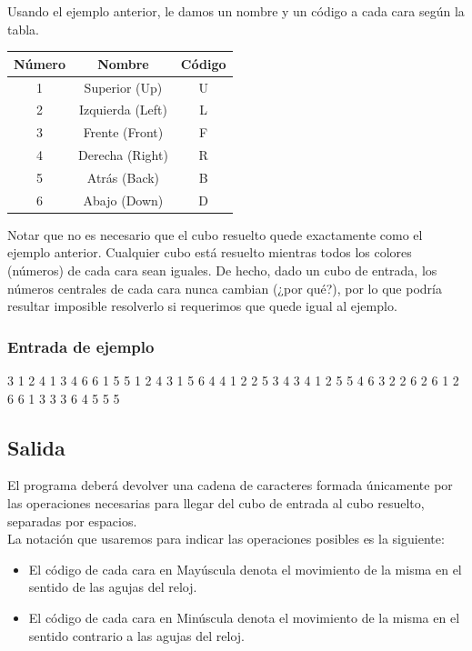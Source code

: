 \documentclass[11pt,a4paper]{article}
\begin{document}
Usando el ejemplo anterior, le damos un nombre y un código a cada cara según la tabla. \\

\begin{center}
\begin{tabular}{| c || c | c |}
\hline
Número & Nombre & Código \\ \hline
1 & Superior (Up) & U \\ \hline
2 & Izquierda (Left) & L \\ \hline
3 & Frente (Front) & F \\ \hline
4 & Derecha (Right) & R \\ \hline
5 & Atrás (Back) & B \\ \hline
6 & Abajo (Down) & D \\ \hline
\end{tabular}
\end{center}

Notar que no es necesario que el cubo resuelto quede exactamente como el ejemplo anterior. Cualquier cubo está resuelto mientras todos los colores (números) de cada cara sean iguales.
De hecho, dado un cubo de entrada, los números centrales de cada cara nunca cambian (¿por qué?), por lo que podría resultar imposible resolverlo si requerimos que quede igual al ejemplo.

\subsubsection{Entrada de ejemplo}
\begin{center}
\begin{verbbox}
      3 1 2
      4 1 3
      4 6 6
1 5 5 1 2 4 3 1 5 6 4 4
1 2 2 5 3 4 3 4 1 2 5 5
4 6 3 2 2 6 2 6 1 2 6 6
      1 3 3
      3 6 4
      5 5 5
\end{verbbox}
\theverbbox
\end{center}


\subsection{Salida}
El programa deberá devolver una cadena de caracteres formada únicamente por las operaciones necesarias para llegar del cubo de entrada al cubo resuelto, separadas por espacios.\\
La notación que usaremos para indicar las operaciones posibles es la siguiente:
\begin{itemize}
\item El código de cada cara en Mayúscula denota el movimiento de la misma en el sentido de las agujas del reloj.
\item El código de cada cara en Minúscula denota el movimiento de la misma en el sentido contrario a las agujas del reloj.
\end{itemize}
\end{document}
